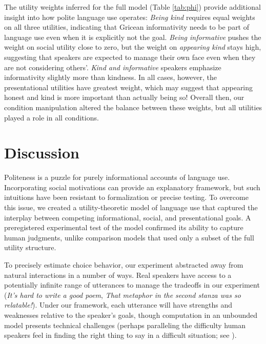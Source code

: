\documentclass[9pt,twocolumn,twoside,lineno]{main_class_file}
\begin{document}
The utility weights inferred for the full model (Table \ref{tab:phi})
provide additional insight into how polite language use operates:
\emph{Being kind} requires equal weights on all three utilities,
indicating that Gricean informativity needs to be part of language use
even when it is explicitly not the goal. \emph{Being informative} pushes
the weight on social utility close to zero, but the weight on
\emph{appearing kind} stays high, suggesting that speakers are expected
to manage their own face even when they are not considering others'.
\emph{Kind and informative} speakers emphasize informativity slightly
more than kindness. In all cases, however, the presentational utilities
have greatest weight, which may suggest that appearing honest and kind
is more important than actually being so! Overall then, our condition
manipulation altered the balance between these weights, but all
utilities played a role in all conditions.

\section*{Discussion}

Politeness is a puzzle for purely informational accounts of language
use. Incorporating social motivations can provide an explanatory
framework, but such intuitions have been resistant to formalization or
precise testing. To overcome this issue, we created a utility-theoretic
model of language use that captured the interplay between competing
informational, social, and presentational goals. A preregistered
experimental test of the model confirmed its ability to capture human
judgments, unlike comparison models that used only a subset of the full
utility structure.

To precisely estimate choice behavior, our experiment abstracted away
from natural interactions in a number of ways. Real speakers have access
to a potentially infinite range of utterances to manage the tradeoffs in
our experiment (\emph{It's hard to write a good poem}, \emph{That
metaphor in the second stanza was so relatable!}). Under our framework,
each utterance will have strengths and weaknesses relative to the
speaker's goals, though computation in an unbounded model presents
technical challenges (perhaps paralleling the difficulty human speakers
feel in finding the right thing to say in a difficult situation; see \cite{goodman2016}).
\end{document}
